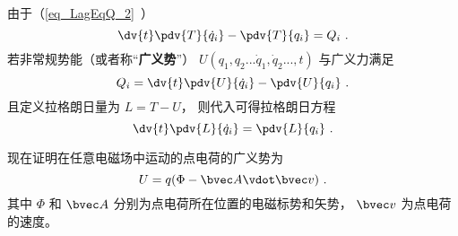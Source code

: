 
\begin{issues}
\issueDraft
\end{issues}


由于（\autoref{eq_LagEqQ_2}~）
\begin{equation}
\dv{t}\pdv{T}{\dot q_i} - \pdv{T}{q_i} = Q_i~.
\end{equation}
若非常规势能（或者称“\textbf{广义势}”）  $U(q_1, q_2...\dot q_1, \dot q_2..., t)$ 与广义力满足
\begin{equation}\label{eq_EMLagP_2}
Q_i = \dv{t} \pdv{U}{\dot q_i} - \pdv{U}{q_i}~.
\end{equation}
且定义拉格朗日量为 $L = T - U$， 则代入可得拉格朗日方程
\begin{equation}
\dv{t} \pdv{L}{\dot q_i} = \pdv{L}{q_i}~.
\end{equation}

现在证明在任意电磁场中运动的点电荷的广义势为
\begin{equation}\label{eq_EMLagP_4}
U = q(\Phi  - \bvec A \vdot \bvec v)~.
\end{equation}
其中 $\Phi$ 和 $\bvec A$ 分别为点电荷所在位置的电磁标势和矢势， $\bvec v$ 为点电荷的速度。

